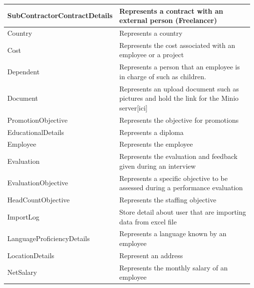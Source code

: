 \documentclass[12pt,a4paper,table,english]{article}
\begin{document}
\begin{center}
\begin{tabularx}{\textwidth}{| l | X |}
			SubContractorContractDetails & Represents a contract with an external person (Freelancer) \\\hline
		
			Country & Represents a country\\\hline
			
			Cost & Represents the cost associated with an employee or a project \\\hline
			
			Dependent & Represents a person that an employee is in charge of such as children.\\\hline
			
			Document & Represents an upload document such as pictures and hold the link for the Minio server[ici]\\\hline
			
			PromotionObjective & Represents the objective for promotions \\\hline
			
			EducationalDetails & Represents a diploma\\\hline
			
			Employee & Represents the employee \\\hline
			
			Evaluation & Represents the evaluation and feedback given during an interview \\\hline
			
			EvaluationObjective & Represents a specific objective to be assessed during a performance evaluation \\\hline
			
			HeadCountObjective & Represents the staffing objective \\\hline
			
			ImportLog & Store detail about user that are importing data from excel file\\\hline
			
			LanguageProficiencyDetails & Represents a language known by an employee\\\hline
						
			LocationDetails & Represent an address\\\hline
			
			NetSalary & Represents the monthly salary of an employee \\\hline
			
		\end{tabularx}
	\end{center}
\end{document}
